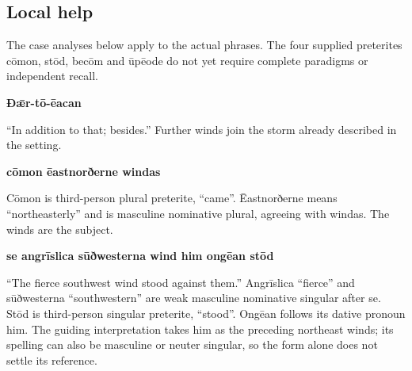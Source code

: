 \subsection*{Local help}

The case analyses below apply to the actual phrases. The four supplied preterites cōmon, stōd, becōm and ūpēode do not yet require complete paradigms or independent recall.

\textbf{Ðǣr-tō-ēacan}

“In addition to that; besides.” Further winds join the storm already described in the setting.

\textbf{cōmon ēastnorðerne windas}

Cōmon is third-person plural preterite, “came”. Ēastnorðerne means “northeasterly” and is masculine nominative plural, agreeing with windas. The winds are the subject.

\textbf{se angrīslica sūðwesterna wind him ongēan stōd}

“The fierce southwest wind stood against them.” Angrīslica “fierce” and sūðwesterna “southwestern” are weak masculine nominative singular after se. Stōd is third-person singular preterite, “stood”. Ongēan follows its dative pronoun him. The guiding interpretation takes him as the preceding northeast winds; its spelling can also be masculine or neuter singular, so the form alone does not settle its reference.

